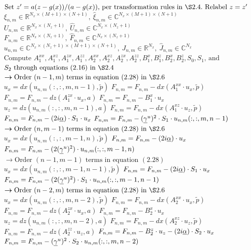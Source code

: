 \begin{algorithm}[H]                    
\begin{algorithmic}[1]
\State $\text{Set $z'=a(z-g(x))/(a-g(x)),$ per transformation rules in $\S 2.4.$ Relabel $z=z'$}$
\State $\xi_{n,m}\in\mathbb R^{N_x \times (M+1) \times (N+1)}, ~ \widehat{\xi}_{n,m}\in \mathbb C^{N_x \times (M+1) \times (N+1)} $
\State $U_{n,m}\in  \mathbb R^{N_x \times (N_z+1)},~ \widehat{U}_{n,m}\in  \mathbb C^{N_x \times (N_z+1)}$
\State $ F_{n,m}\in\mathbb R^{N_x \times (N_z+1)}, ~ \widehat{F}_{n,m}\in\mathbb C^{N_x \times (N_z+1)}$
\State $u_{n,m}\in\mathbb C^{N_x\times (N_z+1) \times (M+1) \times (N+1)}, ~J_{n,m}\in\mathbb R^{N_x}, ~ \widehat{J}_{n,m}\in\mathbb C^{N_x}$
\State $\text{Compute $A_1^{xx},A_1^{xz},A_1^{zx},A_1^{zz},A_2^{xx},A_2^{xz},A_2^{zx},A_2^{zz},B_1^{x},B_1^{z},B_2^{x},B_2^{z},S_0,S_1$, and}$
\State ${\text{$S_2$ through equations $(2.16)$ in $\S 2.4$}}$
 ${\boldsymbol{\rightarrow} \text{Order $(n-1,m)$ terms in equation $(2.28)$ in $\S 2.6 $}}$
\State $u_x = dx(u_{n,m}(:,:,m,n-1),\tilde{p})$
\State $F_{n,m} = F_{n,m} - dx(A_1^{xx}\cdot u_x,\tilde{p})$
\State $F_{n,m} = F_{n,m} - dz(A_1^{zx}\cdot u_x,a)$
\State $F_{n,m} = F_{n,m} - B_1^{x}\cdot u_x$
\State $u_z = dz(u_{n,m}(:,:,m,n-1),a)$
\State $F_{n,m} = F_{n,m} - dx(A_1^{xz}\cdot u_z,\tilde{p})$
\State $F_{n,m} = F_{n,m} - (2i\underline{\alpha})\cdot S_1 \cdot u_x $
\State $F_{n,m} = F_{n,m} - (\underline{\gamma}^u)^2\cdot S_1 \cdot u_{n,m}(:,:,m,n-1)$
\EndIf
{} ${\boldsymbol{\rightarrow} \text{Order $(n,m-1)$ terms in equation $(2.28)$ in $\S 2.6 $}}$
\State $u_x = dx(u_{n,m}(:,:,m-1,n),\tilde{p})$
\State $F_{n,m} = F_{n,m} - (2i\underline{\alpha})\cdot u_x$
\State $F_{n,m} = F_{n,m} - (2(\underline{\gamma}^u)^2)\cdot u_{n,m}(:,:,m-1,n)$
\EndIf
{} ${\boldsymbol{\rightarrow} \text{Order $(n-1,m-1)$ terms in equation $(2.28)$}}$
\State $u_x = dx(u_{n,m}(:,:,m-1,n-1),\tilde{p})$
\State $F_{n,m} = F_{n,m} - (2i\underline{\alpha})\cdot S_1 \cdot u_x$
\State $F_{n,m} = F_{n,m} - (2(\underline{\gamma}^u)^2)\cdot S_1 \cdot u_{n,m}(:,:,m-1,n-1)$
\EndIf
{} ${\boldsymbol{\rightarrow} \text{Order $(n-2,m)$ terms in equation $(2.28)$ in $\S 2.6 $}}$
\State $u_x = dx(u_{n,m}(:,:,m,n-2),\tilde{p})$
\State $F_{n,m} = F_{n,m} - dx(A_2^{xx}\cdot u_x,\tilde{p})$
\State $F_{n,m} = F_{n,m} - dz(A_2^{zx}\cdot u_x,a)$
\State $F_{n,m} = F_{n,m} - B_2^x \cdot u_x$
\State $u_z = dz(u_{n,m}(:,:,m,n-2),a)$
\State $F_{n,m} = F_{n,m} - dx(A_2^{xz} \cdot u_z,\tilde{p})$
\State $F_{n,m} = F_{n,m} - dz(A_2^{zz} \cdot u_z,a)$
\State $F_{n,m} = F_{n,m} - B_2^z \cdot u_z - (2i\underline{\alpha})\cdot S_2 \cdot u_x$
\State $F_{n,m} = F_{n,m} - (\underline{\gamma}^u)^2 \cdot S_2 \cdot u_{n,m}(:,:,m,n-2)$
\EndIf
{}
\end{algorithmic}
\end{algorithm}

